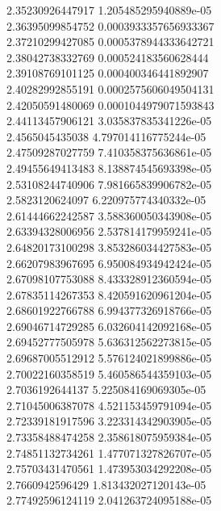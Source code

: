 {2.35230926447917 1.205485295940889e-05 \\
2.36395099854752 0.0003933357656933367 \\
2.37210299427085 0.0005378944333642721 \\
2.38042738332769 0.000524183560628444 \\
2.39108769101125 0.000400346441892907 \\
2.40282992855191 0.0002575606049504131 \\
2.42050591480069 0.0001044979071593843 \\
2.44113457906121 3.035837835341226e-05 \\
2.4565045435038 4.797014116775244e-05 \\
2.47509287027759 7.410358375636861e-05 \\
2.49455649413483 8.138874545693398e-05 \\
2.53108244740906 7.981665839906782e-05 \\
2.5823120624097 6.220975774340332e-05 \\
2.61444662242587 3.588360050343908e-05 \\
2.63394328006956 2.537814179959241e-05 \\
2.64820173100298 3.853286034427583e-05 \\
2.66207983967695 6.950084934942424e-05 \\
2.67098107753088 8.433328912360594e-05 \\
2.67835114267353 8.420591620961204e-05 \\
2.68601922766788 6.994377326918766e-05 \\
2.69046714729285 6.032604142092168e-05 \\
2.69452777505978 5.636312562273815e-05 \\
2.69687005512912 5.576124021899886e-05 \\
2.70022160358519 5.460586544359103e-05 \\
2.7036192644137 5.225084169069305e-05 \\
2.71045006387078 4.521153459791094e-05 \\
2.72339181917596 3.223314342903905e-05 \\
2.73358488474258 2.358618075959384e-05 \\
2.74851132734261 1.477071327826707e-05 \\
2.75703431470561 1.473953034292208e-05 \\
2.7660942596429 1.813432027120143e-05 \\
2.77492596124119 2.041263724095188e-05 \\
}
